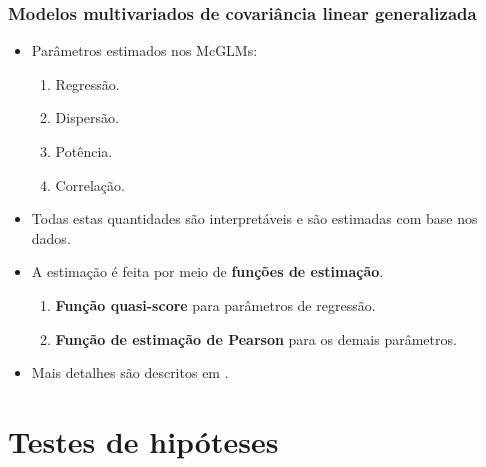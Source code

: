 \documentclass[10pt,
  aspectratio=169,
  serif,
  mathserif,
  professionalfont,
  compress,
  handout,
  ]{beamer}\usepackage[]{graphicx}\usepackage[]{color}
\begin{document}
\begin{frame}
\frametitle{Modelos multivariados de covariância linear generalizada}

\begin{itemize}

\itemsep 2ex
  
  \item Parâmetros estimados nos McGLMs:
    \begin{enumerate}
      \item Regressão.
      \item Dispersão.
      \item Potência.
      \item Correlação.
    \end{enumerate}
  
  \item Todas estas quantidades são interpretáveis e são estimadas com base nos dados.
  
  \item A estimação é feita por meio de \textbf{funções de estimação}.
    \begin{enumerate}
      \item \textbf{Função quasi-score} para parâmetros de regressão. 
      \item \textbf{Função de estimação de Pearson} para os demais parâmetros. 
    \end{enumerate}

  \item Mais detalhes são descritos em \cite{Bonat16}.

\end{itemize}

\end{frame}


\section{Testes de hipóteses}

\end{document}
